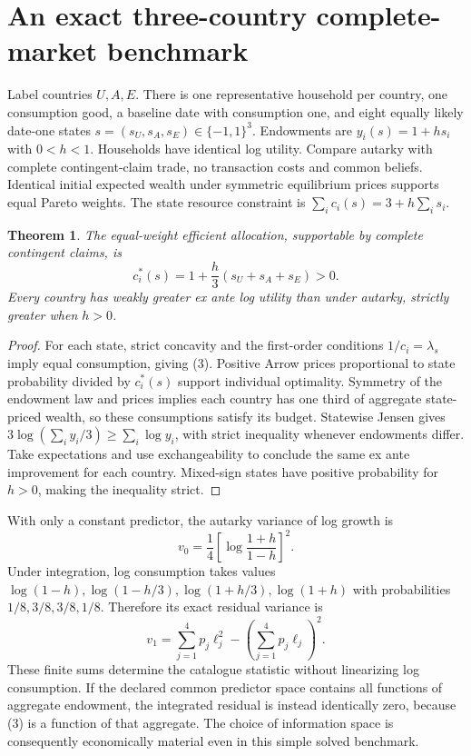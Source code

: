 \documentclass[11pt]{article}
\newtheorem{theorem}{Theorem}
\theoremstyle{definition}
\begin{document}
\section*{An exact three-country complete-market benchmark}
Label countries $U,A,E$. There is one representative household per country,
one consumption good, a baseline date with consumption one, and eight equally
likely date-one states $s=(s_U,s_A,s_E)\in\{-1,1\}^3$. Endowments are
$y_i(s)=1+h s_i$ with $0<h<1$. Households have identical log utility. Compare
autarky with complete contingent-claim trade, no transaction costs and common
beliefs. Identical initial expected wealth under symmetric equilibrium prices
supports equal Pareto weights. The state resource constraint is
$\sum_i c_i(s)=3+h\sum_i s_i$.

\begin{theorem}
The equal-weight efficient allocation, supportable by complete contingent
claims, is
\[
 c_i^*(s)=1+\frac h3(s_U+s_A+s_E)>0.                     \tag{3}
\]
Every country has weakly greater ex ante log utility than under autarky,
strictly greater when $h>0$.
\end{theorem}
\begin{proof}
For each state, strict concavity and the first-order conditions
$1/c_i=\lambda_s$ imply equal consumption, giving (3). Positive Arrow prices
proportional to state probability divided by $c_i^*(s)$ support individual
optimality. Symmetry of the endowment law and prices implies each country has
one third of aggregate state-priced wealth, so these consumptions satisfy its
budget. Statewise Jensen gives
$3\log(\sum_i y_i/3)\ge\sum_i\log y_i$, with strict inequality whenever
endowments differ. Take expectations and use exchangeability to conclude the
same ex ante improvement for each country. Mixed-sign states have positive
probability for $h>0$, making the inequality strict.
\end{proof}
With only a constant predictor, the autarky variance of log growth is
\[
 v_0=\frac14\left[\log\frac{1+h}{1-h}\right]^2.
\]
Under integration, log consumption takes values
$\log(1-h),\log(1-h/3),\log(1+h/3),\log(1+h)$ with probabilities
$1/8,3/8,3/8,1/8$. Therefore its exact residual variance is
\[
 v_1=\sum_{j=1}^4 p_j\ell_j^2-
                  \left(\sum_{j=1}^4p_j\ell_j\right)^2.  \tag{4}
\]
These finite sums determine the catalogue statistic without linearizing log
consumption. If the declared common predictor space contains all functions of
aggregate endowment, the integrated residual is instead identically zero,
because (3) is a function of that aggregate. The choice of information space
is consequently economically material even in this simple solved benchmark.
\end{document}
